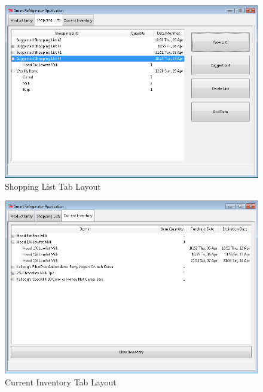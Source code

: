 \documentclass[11pt]{article} %
\begin{document}
\begin{figure}[h!]
\begin{center}
\includegraphics[scale=0.45]{../graphics/ShoppingLists}
\caption{Shopping List Tab Layout}
\label{mock2}
\end{center}
\end{figure}
\pagebreak
\begin{figure}[h!]
\vspace{0.5cm}
\begin{center}
\includegraphics[scale=0.45]{../graphics/CurrentInventory}
\caption{Current Inventory Tab Layout}
\label{mock3}
\end{center}
\end{figure}

\quad \newline
\end{document}
